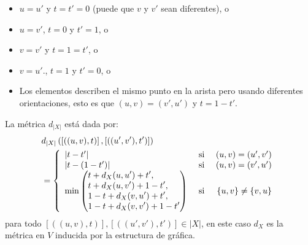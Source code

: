 \documentclass[12pt]{report}
\newcounter{it}
\theoremstyle{largebreak}
\newcommand\abs[1]{\ensuremath{\left|#1\right|}}
\begin{document}
\begin{mydef}
\begin{itemize}
\begin{itemize}
                \begin{itemize}
                    \item $u=u'$ y $t=t'=0$ (puede que $v$ y $v'$ sean diferentes), o
                    \item $u=v'$, $t=0$ y $t'=1$, o
                    \item $v=v'$ y $t=1=t'$, o
                    \item $v=u'$., $t=1$ y $t'=0$, o
                    \item Los elementos describen el mismo punto en la arista pero usando diferentes orientaciones, esto es que $(u,v)=(v',u')$ y $t=1-t'$.
                \end{itemize}
            \end{itemize}
            La métrica $d_{\abs{X}}$ está dada por:
            \begin{equation*}
                \begin{split}
                    &d_{\abs{X}}\left(\left[((u,v),t)\right],\left[((u',v'),t')\right] \right)\\
                    &=\left\{
                        \begin{array}{lcr}
                            \abs{t-t'} & \textup{ si } & (u,v)=(u',v')\\
                            \abs{t-(1-t')} & \textup{ si } & (u,v)=(v',u')\\
                            \min\left(
                                \begin{split}
                                    &t+d_X(u,u')+t',\\
                                    &t+d_X(u,v')+1-t',\\
                                    &1-t+d_X(v,u')+t',\\
                                    &1-t+d_X(v,v')+1-t'\\ 
                                \end{split}
                            \right) & \textup{ si } & \left\{u,v \right\}\neq\left\{v,u \right\}\\
                        \end{array}
                    \right.
                \end{split}
            \end{equation*}
            para todo $\left[((u,v),t)\right],\left[((u',v'),t')\right]\in \abs{X}$, en este caso $d_X$ es la métrica en $V$ inducida por la estructura de gráfica.
        \end{itemize}
    \end{mydef}
\end{document}
